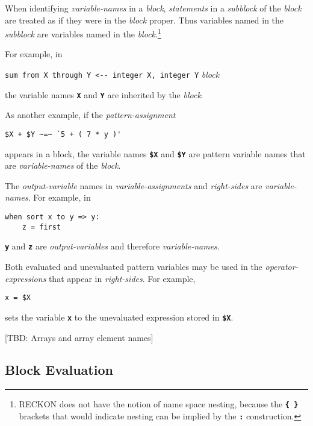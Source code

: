 \documentclass[12pt]{article}
\newcommand{\TT}[1]{{\tt \bfseries #1}}
\newenvironment{indpar}[1][0.3in]%
	{\begin{list}{}%
		     {\setlength{\itemsep}{0in}%
		      \setlength{\topsep}{0in}%
		      \setlength{\parsep}{1ex}%
		      \setlength{\labelwidth}{#1}%
		      \setlength{\leftmargin}{#1}%
		      \addtolength{\leftmargin}{\labelsep}}%
	 \item}%
	{\end{list}}
\begin{document}
When identifying {\em variable-names} in a {\em block}, {\em statements} in a
{\em subblock} of the {\em block} are treated as if they
were in the {\em block} proper.  Thus variables named in the
{\em subblock} are variables named in the {\em block}.\footnote{
RECKON does not have the notion of name space nesting, because the
\TT{\{ \}} brackets that would
indicate nesting can be implied by the \TT{:} construction.}

For example, in

\begin{indpar}[1in]
\verb|sum from X through Y <-- integer X, integer Y| {\em block}
\end{indpar}

the variable names \TT{X} and \TT{Y} are inherited by the {\em block}.

As another example, if the {\em pattern-assignment}

\begin{indpar}[1in]
\verb|$X + $Y ~=~ `5 + ( 7 * y )'|
\end{indpar}

appears in a block,
the variable names \TT{\$X} and \TT{\$Y} are pattern variable names
that are {\em variable-names} of the {\em block}.

The {\em output-variable} names in {\em variable-assignments}
and {\em right-sides} are {\em variable-names}.  For example, in

\begin{indpar}[1in]\begin{verbatim}
when sort x to y => y:
    z = first 
\end{verbatim}\end{indpar}

\TT{y} and \TT{z} are {\em output-variables} and therefore
{\em variable-names}.

Both evaluated and unevaluated pattern variables may be used in
the {\em operator-expressions} that appear in {\em right-sides}.
For example,
\begin{indpar}[1in]\begin{verbatim}
x = $X
\end{verbatim}\end{indpar}

sets the variable \TT{x} to the unevaluated expression stored in
\TT{\$X}.

[TBD: Arrays and array element names]

\subsection{Block Evaluation}
\label{BLOCK-EVALUATION}
\end{document}
